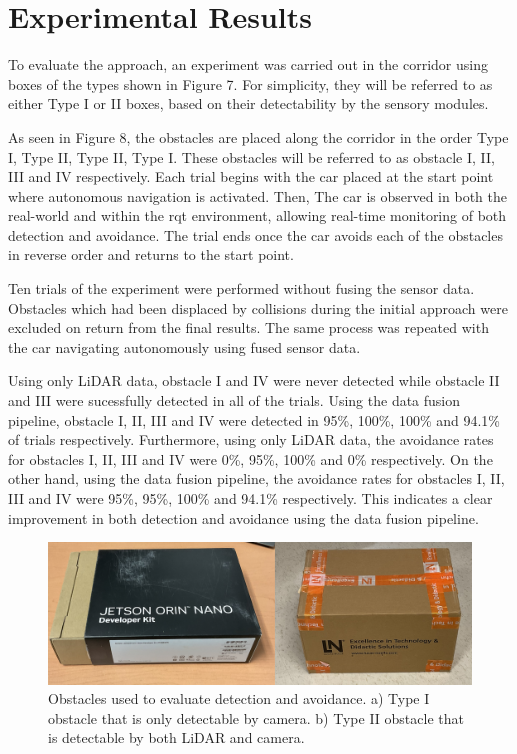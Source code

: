 \documentclass[conference]{IEEEtran}
\begin{document}
\section{Experimental Results}
To evaluate the approach, an experiment was carried out in the corridor using boxes of the types shown in Figure 7. For simplicity, they will be referred to as either Type I or II boxes, based on their detectability by the sensory modules.

As seen in Figure 8, the obstacles are placed along the corridor in the order Type I, Type II, Type II, Type I. These obstacles will be referred to as obstacle I, II, III and IV respectively. Each trial begins with the car placed at the start point where autonomous navigation is activated. Then, The car is observed in both the real-world and within the rqt environment, allowing real-time monitoring of both detection and avoidance. The trial ends once the car avoids each of the obstacles in reverse order and returns to the start point. 

Ten trials of the experiment were performed without fusing the sensor data. Obstacles which had been displaced by collisions during the initial approach were excluded on return from the final results. The same process was repeated with the car navigating autonomously using fused sensor data.

Using only LiDAR data, obstacle I and IV were never detected while obstacle II and III were sucessfully detected in all of the trials. Using the data fusion pipeline, obstacle I, II, III and IV were detected in 95\%, 100\%, 100\% and 94.1\%  of trials respectively. Furthermore, using only LiDAR data, the avoidance rates for obstacles I, II, III and IV were 0\%, 95\%, 100\% and 0\% respectively. On the other hand, using the data fusion pipeline, the avoidance rates for obstacles I, II, III and IV were 95\%, 95\%, 100\% and 94.1\% respectively. This indicates a clear improvement in both detection and avoidance using the data fusion pipeline. 





\begin{figure}
    \centering
    \includegraphics[scale=0.2]{paper_obstacle_image.png}
    \caption{Obstacles used to evaluate detection and avoidance. a) Type I obstacle that is only detectable by camera. b) Type II obstacle that is detectable by both LiDAR and camera.}
    \label{Figure 7}
\end{figure}
\end{document}
